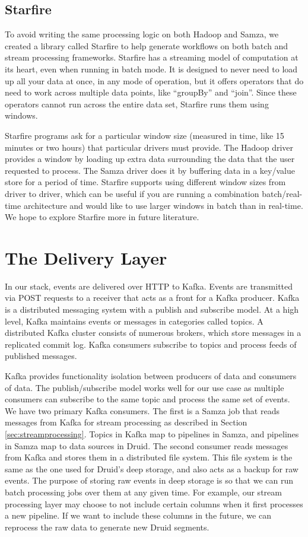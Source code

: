 \documentclass{vldb}
\begin{document}
\subsection{Starfire}
To avoid writing the same processing logic on both Hadoop and Samza, we created
a library called Starfire to help generate workflows on both batch and stream
processing frameworks. Starfire has a streaming model of computation at its
heart, even when running in batch mode. It is designed to never need to load up
all your data at once, in any mode of operation, but it offers operators that
do need to work across multiple data points, like “groupBy” and “join”. Since
these operators cannot run across the entire data set, Starfire runs them using
windows.

Starfire programs ask for a particular window size (measured in time, like 15
minutes or two hours) that particular drivers must provide. The Hadoop driver
provides a window by loading up extra data surrounding the data that the user
requested to process. The Samza driver does it by buffering data in a key/value
store for a period of time. Starfire supports using different window sizes from
driver to driver, which can be useful if you are running a combination
batch/real-time architecture and would like to use larger windows in batch than
in real-time. We hope to explore Starfire more in future literature.

\section{The Delivery Layer}
\label{sec:delivery}
In our stack, events are delivered over HTTP to Kafka. Events are transmitted
via POST requests to a receiver that acts as a front for a Kafka producer.
Kafka is a distributed messaging system with a publish and subscribe model. At
a high level, Kafka maintains events or messages in categories called topics. A
distributed Kafka cluster consists of numerous brokers, which store messages in
a replicated commit log. Kafka consumers subscribe to topics and process feeds
of published messages. 

Kafka provides functionality isolation between producers of data and consumers
of data. The publish/subscribe model works well for our use case as multiple
consumers can subscribe to the same topic and process the same set of events.
We have two primary Kafka consumers. The first is a Samza job that reads
messages from Kafka for stream processing as described in Section
\ref{sec:streamprocessing}. Topics in Kafka map to pipelines in Samza, and
pipelines in Samza map to data sources in Druid. The second consumer reads
messages from Kafka and stores them in a distributed file system.  This file
system is the same as the one used for Druid’s deep storage, and also acts as a
backup for raw events. The purpose of storing raw events in deep storage is so
that we can run batch processing jobs over them at any given time. For example,
our stream processing layer may choose to not include certain columns when it
first processes a new pipeline. If we want to include these columns in the
future, we can reprocess the raw data to generate new Druid segments. 
\end{document}
